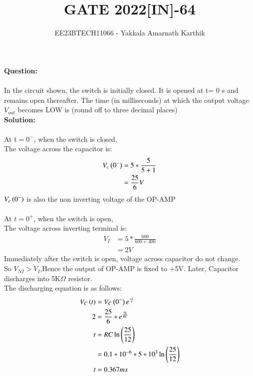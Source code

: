 \documentclass[journal,12pt,twocolumn]{IEEEtran}
\begin{document}


\title{GATE 2022[IN]-64}
\author{EE23BTECH11066 - Yakkala Amarnath Karthik}
\maketitle


\textbf{Question:}\\ \\
In the circuit shown, the switch is initially closed. It is opened at t= 0 s and
remains open thereafter. The time (in milliseconds) at which the output voltage
$V_{out}$ becomes LOW is  (round off to three decimal places)\\


\textbf{Solution:}\\ \\
At t$=0^-$, when the switch is closed,\\
The voltage across the capacitor is:
\begin{align}
V_c\left(0^-\right)&=5*\frac{5}{5+1}\\
&=\frac{25}{6}V
\end{align}
$V_c\left(0^-\right)$ is also the non inverting voltage of the OP-AMP\\ \\
At $t=0^+$, when the switch is open,\\
The voltage across inverting terminal is:
\begin{align}
V_I&=5*\frac{600}{600+400}\\
&=2V
\end{align}
Immediately after the switch is open, voltage across capacitor do not change.\\ So $V_{NI}>V_I$,Hence the output of OP-AMP is fixed to +5V.
Later, Capacitor discharges into 5K$\Omega$ resistor.\\
The discharging equation is as follows:
\begin{align}
    V_C\left(t\right)&=V_C\left(0^-\right)e^{\frac{-t}{\tau}}\\ 
    2&=\frac{25}{6}*e^{\frac{t_0}{RC}}\\
    t&=RC\ln\left(\frac{25}{12}\right)\\
    &=0.1*10^{-6}*5*10^{3}\ln{\ensuremath{\left(\frac{25}{12}\right)}}\\
    t&=0.367ms
\end{align}


\end{document}
